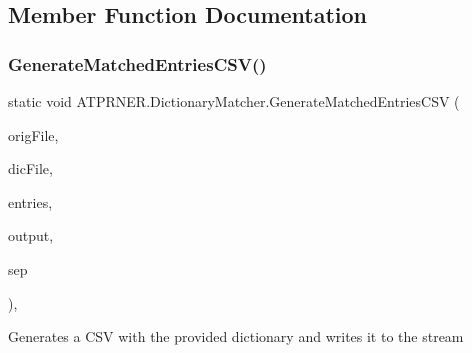\subsection{Member Function Documentation}
\hypertarget{class_a_t_p_r_n_e_r_1_1_dictionary_matcher_a46c40a1214abf84cf7fd1981b193cddf}{}\label{class_a_t_p_r_n_e_r_1_1_dictionary_matcher_a46c40a1214abf84cf7fd1981b193cddf} 
\subsubsection{\texorpdfstring{Generate\+Matched\+Entries\+C\+S\+V()}{GenerateMatchedEntriesCSV()}}
{\footnotesize\ttfamily static void A\+T\+P\+R\+N\+E\+R.\+Dictionary\+Matcher.\+Generate\+Matched\+Entries\+C\+SV (\begin{DoxyParamCaption}\item[{string}]{orig\+File,  }\item[{string}]{dic\+File,  }\item[{Dictionary$<$ string, \hyperlink{class_a_t_p_r_n_e_r_1_1_matched_entity}{Matched\+Entity} $>$}]{entries,  }\item[{Text\+Writer}]{output,  }\item[{char}]{sep }\end{DoxyParamCaption})\hspace{0.3cm}{\ttfamily [inline]}, {\ttfamily [static]}}



Generates a C\+SV with the provided dictionary and writes it to the stream 


